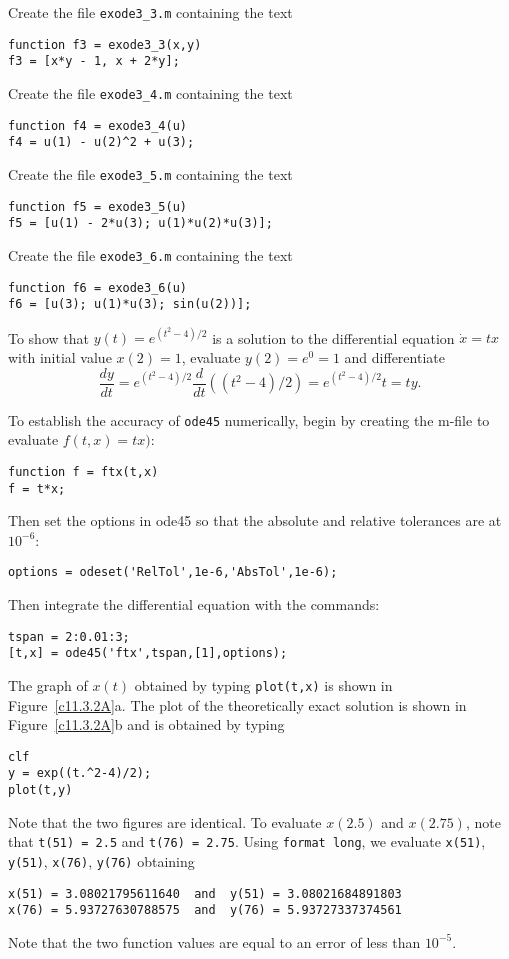 \documentclass{ximera}
\begin{document}
Create the file {\tt exode3\_3.m} containing the text
\begin{verbatim}
function f3 = exode3_3(x,y)
f3 = [x*y - 1, x + 2*y];
\end{verbatim}

Create the file {\tt exode3\_4.m} containing the text
\begin{verbatim}
function f4 = exode3_4(u)
f4 = u(1) - u(2)^2 + u(3);
\end{verbatim}

Create the file {\tt exode3\_5.m} containing the text
\begin{verbatim}
function f5 = exode3_5(u)
f5 = [u(1) - 2*u(3); u(1)*u(2)*u(3)];
\end{verbatim}

Create the file {\tt exode3\_6.m} containing the text
\begin{verbatim}
function f6 = exode3_6(u)
f6 = [u(3); u(1)*u(3); sin(u(2))];
\end{verbatim}


To show that $y(t)=e^{(t^2-4)/2}$ is a solution to the differential equation
$\dot{x}=tx$ with initial value $x(2)=1$, evaluate $y(2)=e^0=1$ and
differentiate
\[
\frac{dy}{dt} = e^{(t^2-4)/2}\frac{d}{dt}((t^2-4)/2) = 
e^{(t^2-4)/2}t = ty.
\]

To establish the accuracy of {\tt ode45} numerically, begin by creating the 
m-file to evaluate $f(t,x)=tx)$:
\begin{verbatim}
function f = ftx(t,x)
f = t*x;
\end{verbatim}
Then set the options in {\sf ode45} so that the absolute and relative
tolerances are at $10^{-6}$:
\begin{verbatim}
options = odeset('RelTol',1e-6,'AbsTol',1e-6);
\end{verbatim}
Then integrate the differential equation with the commands:
\begin{verbatim}
tspan = 2:0.01:3;
[t,x] = ode45('ftx',tspan,[1],options);
\end{verbatim}
The graph of $x(t)$ obtained by typing {\tt plot(t,x)} is shown in
Figure~\ref{c11.3.2A}a.  The plot of the theoretically exact solution
is shown in Figure~\ref{c11.3.2A}b and is obtained by typing
\begin{verbatim}
clf
y = exp((t.^2-4)/2);
plot(t,y)
\end{verbatim}
Note that the two figures are identical.  To evaluate $x(2.5)$ and $x(2.75)$,
note that {\tt t(51) = 2.5} and {\tt t(76) = 2.75}.  Using {\tt format long}, 
we evaluate {\tt x(51)}, {\tt y(51)}, {\tt x(76)}, {\tt y(76)} obtaining
\newpage
\begin{verbatim}
x(51) = 3.08021795611640  and  y(51) = 3.08021684891803
x(76) = 5.93727630788575  and  y(76) = 5.93727337374561
\end{verbatim}
Note that the two function values are equal to an error of less than 
$10^{-5}$.
\end{document}
